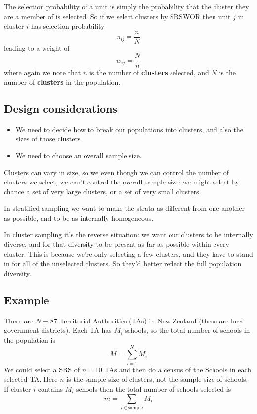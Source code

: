 \documentclass[
]{book}
\providecommand{\tightlist}{%
  \setlength{\itemsep}{0pt}\setlength{\parskip}{0pt}}
\begin{document}
The selection probability of a unit is simply the probability that the cluster
they are a member of is selected. So if we select clusters by SRSWOR then unit \(j\)
in cluster \(i\) has selection probability
\[
   \pi_{ij} = \frac{n}{N}
\]
leading to a weight of
\[
   w_{ij} = \frac{N}{n}
\]
where again we note that \(n\) is the number of \textbf{clusters} selected, and \(N\)
is the number of \textbf{clusters} in the population.

\subsection*{Design considerations}\label{design-considerations-6}

\begin{itemize}
\tightlist
\item
  We need to decide how to break our populations into clusters,
  and also the sizes of those clusters
\item
  We need to choose an overall sample size.
\end{itemize}

Clusters can vary in size, so we even though we can control
the number of clusters we select, we can't control the overall
sample size: we might select by chance a set of very large
clusters, or a set of very small clusters.

In stratified sampling we want to make the strata as different from
one another as possible, and to be as internally homogeneous.

In cluster sampling it's the reverse situation: we want our clusters to be internally
diverse, and for that diversity to be present as far as possible within
every cluster. This is because we're only selecting a few clusters, and
they have to stand in for all of the unselected clusters. So they'd better
reflect the full population diversity.

\subsection*{Example}\label{example-6}

There are \(N=87\) Territorial Authorities (TAs) in New Zealand (these are
local government districts). Each TA has \(M_i\) schools, so the total
number of schools in the population is
\[
    M = \sum_{i=1}^N M_i
\]
We could select a SRS of \(n=10\) TAs and then do a
census of the Schools in each selected TA. Here \(n\) is the sample size
of clusters, not the sample size of schools. If cluster \(i\) contains \(M_i\)
schools then the total number of schools selected is
\[
    m = \sum_{i\in\text{sample}} M_i
\]
\end{document}
